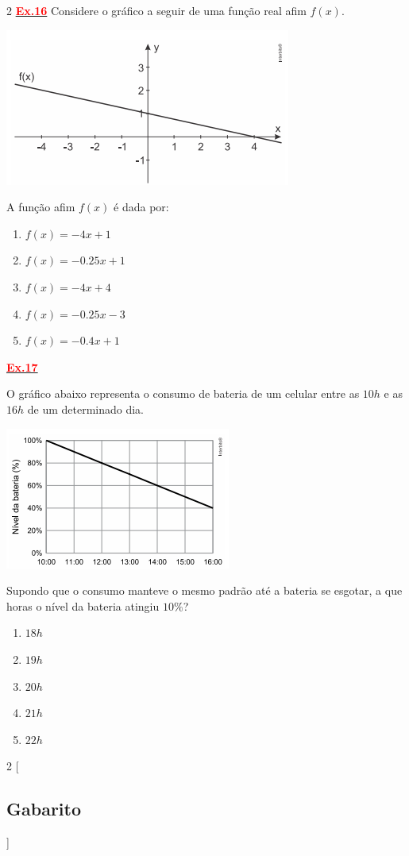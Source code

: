 \documentclass[12pt]{report}
\newcommand{\ex}[1]{\hypertarget{ex#1}{\noindent\hyperlink{gab#1}{\textcolor{red}{\textbf{Ex.#1}}}}}
\newenvironment{Figure}
  {\par\medskip\noindent\minipage{\linewidth}}
  {\endminipage\par\medskip}
\begin{document}
\begin{multicols}{2}
\ex{16} Considere o gráfico a seguir de uma função real afim $f(x)$.
\begin{Figure}
 \centering
 \includegraphics[scale=0.7]{figures/q11.png}
\end{Figure}
A função afim $f(x)$ é dada por:
\begin{enumerate}[label=\alph*)]
	\item $f(x) = -4x+1$
	\item $f(x) = -0.25x+1$
	\item $f(x) = -4x+4$
	\item $f(x) = -0.25x-3$
	\item $f(x) = -0.4x+1$
\end{enumerate}

\ex{17} O gráfico abaixo representa o consumo de bateria de um celular entre as $10h$ e as $16h$ de um determinado dia.
\begin{Figure}
	\centering
	\includegraphics[scale=0.7]{figures/q12.png}
\end{Figure}
Supondo que o consumo manteve o mesmo padrão até a bateria se esgotar, a que horas o nível da bateria atingiu $10\%$?

\begin{enumerate}[label=\alph*)]
	\item $18h$
	\item $19h$
	\item $20h$
	\item $21h$
	\item $22h$
\end{enumerate}

\end{multicols}

\newpage
\begin{multicols}{2}
[
\begin{center}
\section*{Gabarito}
\end{center}
]

\end{multicols}
\end{document}
